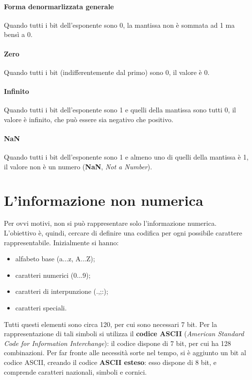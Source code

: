 \paragraph*{Forma denormarlizzata generale}
Quando tutti i bit dell'esponente sono 0, la mantissa non è sommata ad 1 ma bensì a 0.

\paragraph*{Zero}
Quando tutti i bit (indifferentemente dal primo) sono 0, il valore è 0.

\paragraph*{Infinito}
Quando tutti i bit dell'esponente sono 1 e quelli della mantissa sono tutti 0, il valore è infinito, che può essere sia negativo che positivo.

\paragraph*{NaN}
Quando tutti i bit dell'esponente sono 1 e almeno uno di quelli della mantissa è 1, il valore non è un numero (\textbf{NaN}, \emph{Not a Number}).


\section{L'informazione non numerica}

Per ovvi motivi, non si può rappresentare solo l'informazione numerica. L'obiettivo è, quindi, cercare di definire una codifica per ogni possibile carattere rappresentabile. Inizialmente si hanno:
\begin{itemize}
  \item alfabeto base (a...z, A...Z);
  \item caratteri numerici (0...9);
  \item caratteri di interpunzione (.,;:);
  \item caratteri speciali.
\end{itemize}

Tutti questi elementi sono circa 120, per cui sono necessari 7 bit.
Per la rappresentazione di tali simboli si utilizza il \textbf{codice ASCII} (\emph{American Standard Code for Information Interchange}): il codice dispone di 7 bit, per cui ha 128 combinazioni.
Per far fronte alle necessità sorte nel tempo, si è aggiunto un bit al codice ASCII, creando il codice \textbf{ASCII esteso}: esso dispone di 8 bit, e comprende caratteri nazionali, simboli e cornici.


